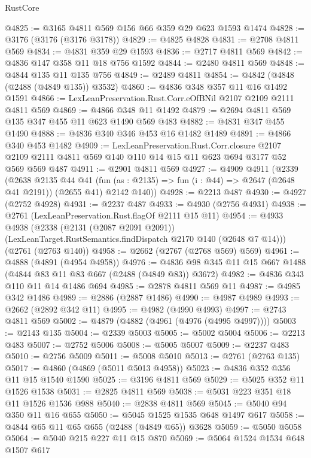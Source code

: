 \begin{lexlean}{RustCore}
\begin{coremodule}
@4825 := @3165 @4811 @569 @156 @66 @359 @29 @623 @1593 @1474
@4828 := @3176 (@3176 (@3176 @3178))
@4829 := @4825 @4828
@4831 := @2708 @4811 @569
@4834 := @4831 @359 @29 @1593
@4836 := @2717 @4811 @569
@4842 := @4836 @147 @358 @11 @18 @756 @1592
@4844 := @2480 @4811 @569
@4848 := @4844 @135 @11 @135 @756
@4849 := @2489 @4811
@4854 := @4842 (@4848 (@2488 (@4849 @135)) @3532)
@4860 := @4836 @348 @357 @11 @16 @1492 @1591
@4866 := LexLeanPreservation.Rust.Corr.eOfBNil @2107 @2109 @2111 @4811 @569
@4869 := @4866 @348 @11 @1492
@4879 := @2694 @4811 @569 @135 @347 @455 @11 @623 @1490 @569 @483
@4882 := @4831 @347 @455 @1490
@4888 := @4836 @340 @346 @453 @16 @1482 @1489
@4891 := @4866 @340 @453 @1482
@4909 := LexLeanPreservation.Rust.Corr.closure
    @2107
    @2109
    @2111
    @4811
    @569
    @140
    @110
    @14
    @15
    @11
    @623
    @694
    @3177
    @52
    @569
    @569
    @487
@4911 := @2901 @4811 @569
@4927 := @4909
    @4911
    (@2339
      (@2638
        @2135
        @44
        @41
        (fun (as : @2135) => fun (i : @44) => @2647 (@2648 @41 @2191))
        (@2655 @41)
        @2142
        @140))
@4928 := @2213 @487
@4930 := @4927 (@2752 @4928)
@4931 := @2237 @487
@4933 := @4930 (@2756 @4931)
@4938 := @2761 (LexLeanPreservation.Rust.flagOf @2111 @15 @11)
@4954 := @4933
    @4938
    (@2338
      (@2131 (@2087 @2091 @2091))
      (LexLeanTarget.RustSemantics.findDispatch @2170 @140 (@2648 @7 @14)))
    (@2761 (@2763 @140))
@4958 := @2662 (@2767 (@2768 @569) @569)
@4961 := @4888 (@4891 (@4954 @4958))
@4976 := @4836 @98 @345 @11 @15 @667 @1488 (@4844 @83 @11 @83 @667 (@2488 (@4849 @83)) @3672)
@4982 := @4836 @343 @110 @11 @14 @1486 @694
@4985 := @2878 @4811 @569 @11
@4987 := @4985 @342 @1486
@4989 := @2886 (@2887 @1486)
@4990 := @4987 @4989
@4993 := @2662 (@2892 @342 @11)
@4995 := @4982 (@4990 @4993)
@4997 := @2743 @4811 @569
@5002 := @4879 (@4882 (@4961 (@4976 (@4995 @4997))))
@5003 := @2143 @135
@5004 := @2339 @5003
@5005 := @5002 @5004
@5006 := @2213 @483
@5007 := @2752 @5006
@5008 := @5005 @5007
@5009 := @2237 @483
@5010 := @2756 @5009
@5011 := @5008 @5010
@5013 := @2761 (@2763 @135)
@5017 := @4860 (@4869 (@5011 @5013 @4958))
@5023 := @4836 @352 @356 @11 @15 @1540 @1590
@5025 := @3196 @4811 @569
@5029 := @5025 @352 @11 @1526 @1538
@5031 := @2825 @4811 @569
@5038 := @5031 @223 @351 @18 @11 @1526 @1536 @988
@5040 := @2838 @4811 @569
@5045 := @5040 @94 @350 @11 @16 @655
@5050 := @5045 @1525 @1535 @648 @1497 @617
@5058 := @4844 @65 @11 @65 @655 (@2488 (@4849 @65)) @3628
@5059 := @5050 @5058
@5064 := @5040 @215 @227 @11 @15 @870
@5069 := @5064 @1524 @1534 @648 @1507 @617

\end{coremodule}
\end{lexlean}
